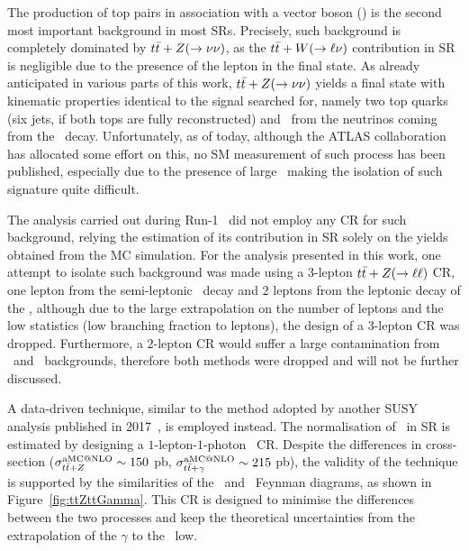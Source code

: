 		The production of top pairs in association with a vector boson (\ttV) is the second most important background in most \acp{SR}. Precisely, such background is completely dominated by $t\bar{t}+Z(\rightarrow \nu\nu)$, as the $t\bar{t}+W(\rightarrow \ell \nu)$ contribution in \ac{SR} is negligible due to the presence of the lepton in the final state. As already anticipated in various parts of this work, $t\bar{t}+Z(\rightarrow \nu\nu)$ yields a final state with kinematic properties identical to the signal searched for, namely two top quarks (six jets, if both tops are fully reconstructed) and \met\ from the neutrinos coming from the \Zboson\ decay. Unfortunately, as of today, although the \ac{ATLAS} collaboration has allocated some effort on this, no \ac{SM} measurement of such process has been published, especially due to the presence of large \met\ making the isolation of such signature quite difficult.

		The analysis carried out during Run-1~\cite{stop0LRun1} did not employ any \ac{CR} for such background, relying the estimation of its contribution in \ac{SR} solely on the yields obtained from the \ac{MC} simulation. For the analysis presented in this work, one attempt to isolate such background was made using a $3$-lepton $t\bar{t}+Z(\rightarrow\ell\ell)$ \ac{CR}, one lepton from the semi-leptonic \ttbar\ decay and $2$ leptons from the leptonic decay of the \Zboson, although due to the large extrapolation on the number of leptons and the low statistics (low branching fraction to leptons), the design of a $3$-lepton \ac{CR} was dropped. Furthermore, a $2$-lepton \ac{CR} would suffer a large contamination from \ttbar\ and \Zjets\ backgrounds, therefore both methods were dropped and will not be further discussed.

		A data-driven technique, similar to the method adopted by another \ac{SUSY} analysis published in 2017~\cite{stop1L}, is employed instead. The normalisation of \ttZ\ in \ac{SR} is estimated by designing a $1$-lepton-$1$-photon \ttgamma\ \ac{CR}. Despite the differences in cross-section ($\sigma_{t\bar{t}+Z}^{\mathrm{aMC@NLO}} \sim 150$ pb, $\sigma_{t\bar{t}+\gamma}^{\mathrm{aMC@NLO}} \sim 215$ pb), the validity of the technique is supported by the similarities of the \ttZ\ and \ttgamma\ Feynman diagrams, as shown in Figure~\ref{fig:ttZttGamma}. This \ac{CR} is designed to minimise the differences between the two processes and keep the theoretical uncertainties from the extrapolation of the $\gamma$ to the \Zboson\ low. 

